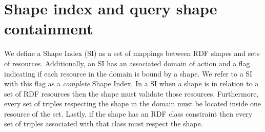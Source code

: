 \section{Shape index and query shape containment}


We define a Shape Index (SI) as a set of mappings between RDF shapes and sets of resources.
Additionally, an SI has an associated domain of action
and a flag indicating if each resource in the domain is bound by a shape. 
We refer to a SI with this flag as a \emph{complete} Shape Index.
In a SI when a shape is in relation to a set of RDF resources then the shape must validate those resources.
Furthermore, every set of triples respecting the shape in the domain must be located inside one resource of the set.
Lastly, if the shape has an RDF class constraint
then every set of triples associated with that class must respect the shape. 

